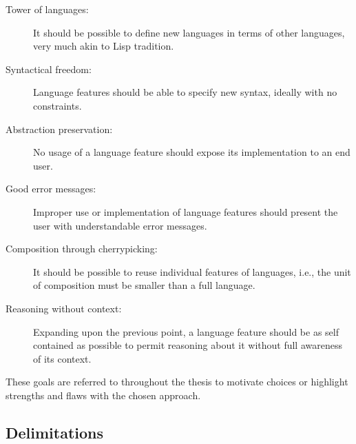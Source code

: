 \documentclass{kththesis}
\begin{document}
\begin{description}
  \item[Tower of languages:] It should be possible to define new languages in terms of other languages, very much akin to Lisp tradition.
  \item[Syntactical freedom:] Language features should be able to specify new syntax, ideally with no constraints.
  \item[Abstraction preservation:] No usage of a language feature should expose its implementation to an end user.
  \item[Good error messages:] Improper use or implementation of language features should present the user with understandable error messages.
  \item[Composition through cherrypicking:] It should be possible to reuse individual features of languages, i.e., the unit of composition must be smaller than a full language.
  \item[Reasoning without context:] Expanding upon the previous point, a language feature should be as self contained as possible to permit reasoning about it without full awareness of its context.
\end{description}

These goals are referred to throughout the thesis to motivate choices or highlight strengths and flaws with the chosen approach.

\subsection{Delimitations} \label{sec:delimitations}
\end{document}
